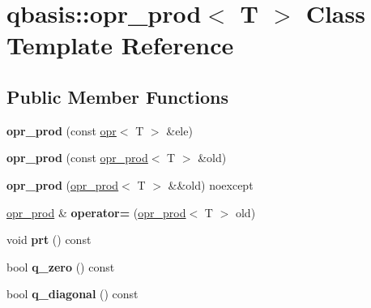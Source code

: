 \hypertarget{classqbasis_1_1opr__prod}{}\section{qbasis\+:\+:opr\+\_\+prod$<$ T $>$ Class Template Reference}
\label{classqbasis_1_1opr__prod}
\subsection*{Public Member Functions}
\begin{DoxyCompactItemize}
\item 
\mbox{\label{classqbasis_1_1opr__prod_a0a795a030601ada243293206e3d93584}} 
{\bfseries opr\+\_\+prod} (const \hyperlink{classqbasis_1_1opr}{opr}$<$ T $>$ \&ele)
\item 
\mbox{\label{classqbasis_1_1opr__prod_acdbfee7b1be503deda51d6ad62bbdb39}} 
{\bfseries opr\+\_\+prod} (const \hyperlink{classqbasis_1_1opr__prod}{opr\+\_\+prod}$<$ T $>$ \&old)
\item 
\mbox{\label{classqbasis_1_1opr__prod_a6a587275144e99a42032fce2987de293}} 
{\bfseries opr\+\_\+prod} (\hyperlink{classqbasis_1_1opr__prod}{opr\+\_\+prod}$<$ T $>$ \&\&old) noexcept
\item 
\mbox{\label{classqbasis_1_1opr__prod_aee45e21cd7e75661db0eba2ceb3b1c5e}} 
\hyperlink{classqbasis_1_1opr__prod}{opr\+\_\+prod} \& {\bfseries operator=} (\hyperlink{classqbasis_1_1opr__prod}{opr\+\_\+prod}$<$ T $>$ old)
\item 
\mbox{\label{classqbasis_1_1opr__prod_aa006a77fe4a13b9d457f65731862af0f}} 
void {\bfseries prt} () const
\item 
\mbox{\label{classqbasis_1_1opr__prod_aba82a3e15e24f132facb59859be2550d}} 
bool {\bfseries q\+\_\+zero} () const
\item 
\mbox{\label{classqbasis_1_1opr__prod_a72745ea76797b8ba7bb15cc11ece5178}} 
bool {\bfseries q\+\_\+diagonal} () const
\item 
\mbox{\label{classqbasis_1_1opr__prod_a8e10a2c6d9e3ef0140fb75747f97f425}} 

\end{DoxyCompactItemize}
